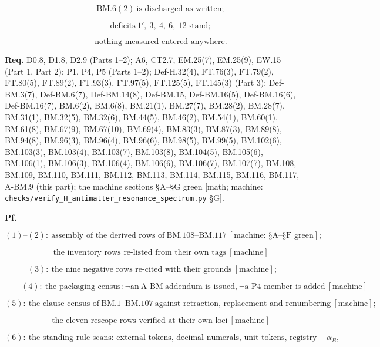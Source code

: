 \documentclass[11pt,openany]{report}
\theoremstyle{canonplain}
\theoremstyle{canondef}
\begin{document}
\[
\qquad \mathrm{BM.6}(2)\ \text{is discharged as written};
\]

\[
\qquad \text{deficits}\ 1',\ 3,\ 4,\ 6,\ 12\ \text{stand};
\]

\[
\qquad \text{nothing measured entered anywhere}.
\]

\textbf{Req.} D0.8, D1.8, D2.9 (Parts 1–2); A6, CT2.7, EM.25(7), EM.25(9), EW.15 (Part 1, Part 2); P1, P4, P5 (Parts 1–2); Def-H.32(4), FT.76(3), FT.79(2), FT.80(5), FT.89(2), FT.93(3), FT.97(5), FT.125(5), FT.145(3) (Part 3); Def-BM.3(7), Def-BM.6(7), Def-BM.14(8), Def-BM.15, Def-BM.16(5), Def-BM.16(6), Def-BM.16(7), BM.6(2), BM.6(8), BM.21(1), BM.27(7), BM.28(2), BM.28(7), BM.31(1), BM.32(5), BM.32(6), BM.44(5), BM.46(2), BM.54(1), BM.60(1), BM.61(8), BM.67(9), BM.67(10), BM.69(4), BM.83(3), BM.87(3), BM.89(8), BM.94(8), BM.96(3), BM.96(4), BM.96(6), BM.98(5), BM.99(5), BM.102(6), BM.103(3), BM.103(4), BM.103(7), BM.103(8), BM.104(5), BM.105(6), BM.106(1), BM.106(3), BM.106(4), BM.106(6), BM.106(7), BM.107(7), BM.108, BM.109, BM.110, BM.111, BM.112, BM.113, BM.114, BM.115, BM.116, BM.117, A-BM.9 (this part); the machine sections §A–§G green [math; machine: \texttt{checks/\allowbreak{}verify\_\allowbreak{}H\_\allowbreak{}antimatter\_\allowbreak{}resonance\_\allowbreak{}spectrum.py} §G].

\textbf{Pf.}

\[
(1)\text{--}(2):\  \text{assembly of the derived rows of}\ \mathrm{BM.108}\text{--}\mathrm{BM.117}\ [\text{machine: §A--§F green}];
\]

\[
\qquad \text{the inventory rows re-listed from their own tags}\ [\text{machine}]
\]

\[
(3):\  \text{the nine negative rows re-cited with their grounds}\ [\text{machine}];
\]

\[
\qquad (4):\  \text{the packaging census:}\ \neg\text{an}\ \mathrm{A\text{-}BM}\ \text{addendum is issued,}\ \neg\text{a P4 member is added}\ [\text{machine}]
\]

\[
(5):\  \text{the clause census of}\ \mathrm{BM.1}\text{--}\mathrm{BM.107}\ \text{against retraction, replacement and renumbering}\ [\text{machine}];
\]

\[
\qquad \text{the eleven rescope rows verified at their own loci}\ [\text{machine}]
\]

\[
(6):\  \text{the standing-rule scans: external tokens, decimal numerals, unit tokens, registry tokens, declaration lines, the barred object}\ \alpha_B,
\]
\end{document}
